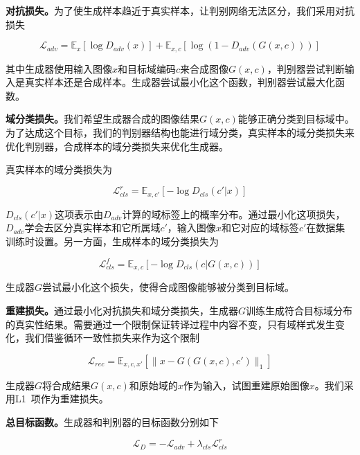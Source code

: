 \textbf{对抗损失。}为了使生成样本趋近于真实样本，让判别网络无法区分，我们采用对抗损失 

\begin{equation}
\label{equ:adv_exp2}
\mathcal{L}_{adv} = \mathbb{E}_x[\log D_{adv}(x)] + \mathbb{E}_{x,c}[\log(1-D_{adv}(G(x,c)))]
\end{equation}

其中生成器使用输入图像$x$和目标域编码$c$来合成图像$G(x,c)$，判别器尝试判断输入是真实样本还是合成样本。生成器尝试最小化这个函数，判别器尝试最大化函数。

\textbf{域分类损失。}我们希望生成器合成的图像结果$G(x,c)$能够正确分类到目标域中。为了达成这个目标，我们的判别器结构也能进行域分类，真实样本的域分类损失来优化判别器，合成样本的域分类损失来优化生成器。

真实样本的域分类损失为

\begin{equation}
\label{equ:cls_real_exp2}
\mathcal{L}_{cls}^{r} = \mathbb{E}_{x,c'}[-\log D_{cls}(c'|x)]
\end{equation}

$D_{cls}(c'|x)$这项表示由$D_{adv}$计算的域标签上的概率分布。通过最小化这项损失，$D_{adv}$学会去区分真实样本和它所属域$c'$，输入图像$x$和它对应的域标签$c'$在数据集训练时设置。另一方面，生成样本的域分类损失为

\begin{equation}
\label{equ:cls_fake_exp2}
\mathcal{L}_{cls}^{f} = \mathbb{E}_{x,c}[-\log D_{cls}(c|G(x,c))]
\end{equation}

生成器$G$尝试最小化这个损失，使得合成图像能够被分类到目标域。

\textbf{重建损失。}通过最小化对抗损失和域分类损失，生成器$G$训练生成符合目标域分布的真实性结果。需要通过一个限制保证转译过程中内容不变，只有域样式发生变化，我们借鉴循环一致性损失来作为这个限制

\begin{equation}
\label{equ:rec_exp2}
\mathcal{L}_{rec} = \mathbb{E}_{x,c,x'}[\| x-G(G(x,c),c') \|_1]
\end{equation}

生成器$G$将合成结果$G(x,c)$和原始域的$x$作为输入，试图重建原始图像$x$。我们采用L1~\cite{shrivastava2017learning}项作为重建损失。

\textbf{总目标函数。}生成器和判别器的目标函数分别如下

\begin{equation}
\label{equ:D_exp2}
\mathcal{L}_{D} = -\mathcal{L}_{adv} + \lambda_{cls}\mathcal{L}_{cls}^{r}
\end{equation}

